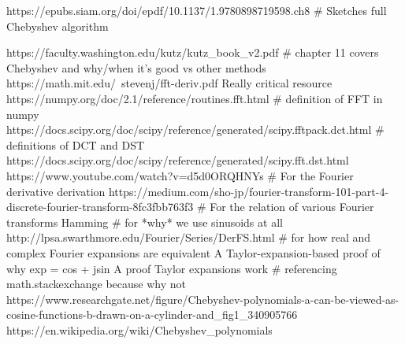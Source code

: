 https://epubs.siam.org/doi/epdf/10.1137/1.9780898719598.ch8 # Sketches full Chebyshev algorithm

https://faculty.washington.edu/kutz/kutz_book_v2.pdf # chapter 11 covers Chebyshev and why/when it's good vs other methods
https://math.mit.edu/~stevenj/fft-deriv.pdf Really critical resource
https://numpy.org/doc/2.1/reference/routines.fft.html # definition of FFT in numpy
https://docs.scipy.org/doc/scipy/reference/generated/scipy.fftpack.dct.html # definitions of DCT and DST
https://docs.scipy.org/doc/scipy/reference/generated/scipy.fft.dst.html
https://www.youtube.com/watch?v=d5d0ORQHNYs # For the Fourier derivative derivation
https://medium.com/sho-jp/fourier-transform-101-part-4-discrete-fourier-transform-8fc3fbb763f3 # For the relation of various Fourier transforms
Hamming  # for *why* we use sinusoids at all
http://lpsa.swarthmore.edu/Fourier/Series/DerFS.html # for how real and complex Fourier expansions are equivalent
A Taylor-expansion-based proof of why exp = cos + jsin
A proof Taylor expansions work # referencing math.stackexchange because why not
https://www.researchgate.net/figure/Chebyshev-polynomials-a-can-be-viewed-as-cosine-functions-b-drawn-on-a-cylinder-and_fig1_340905766
https://en.wikipedia.org/wiki/Chebyshev_polynomials